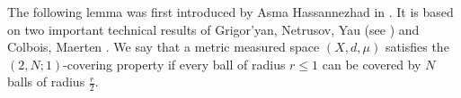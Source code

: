 \documentclass[12pt,reqno]{amsart}		%
\theoremstyle{plain}
\newtheorem{lemma}[thm]{Lemma}
\theoremstyle{definition}
\theoremstyle{remark}
\numberwithin{equation}{section}
\begin{document}






\bigskip
The following lemma was first introduced by Asma Hassannezhad in \cite[Theorem 2.1]{hassannezhad_2011}.
It is based on two important technical results of Grigor'yan, Netrusov, Yau (see \cite[section 3]{grigor}) and Colbois, Maerten \cite[Corollary 2.3]{colbois_maerten_2008}.
We say that a metric measured space $(X,d,\mu)$ satisfies the $(2,N;1)$-covering property if every ball of radius $r\leqslant 1$ can be covered by $N$ balls of radius $\frac{r}{2}$.
\end{document}
